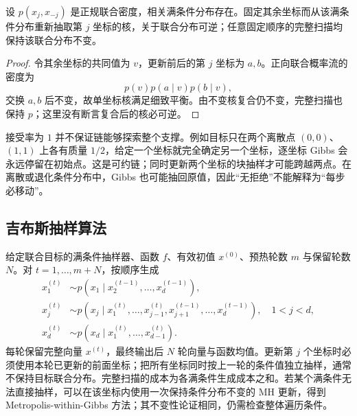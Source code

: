 \begin{proposition}
\label{prop:lh-mcmc-gibbs-invariance}
设 $p(x_j,x_{-j})$ 是正规联合密度，相关满条件分布存在。固定其余坐标而从该满条件分布重新抽取第 $j$ 坐标的核，关于联合分布可逆；任意固定顺序的完整扫描均保持该联合分布不变。
\end{proposition}
\begin{proof}
令其余坐标的共同值为 $v$，更新前后的第 $j$ 坐标为 $a,b$。正向联合概率流的密度为
\[
p(v)p(a\mid v)p(b\mid v),
\]
交换 $a,b$ 后不变，故单坐标核满足细致平衡。由不变核复合仍不变，完整扫描也保持 $p$；这里没有断言复合后的核必可逆。
\end{proof}

接受率为 $1$ 并不保证链能够探索整个支撑。例如目标只在两个离散点 $(0,0)$、$(1,1)$ 上各有质量 $1/2$，给定一个坐标就完全确定另一个坐标，逐坐标 Gibbs 会永远停留在初始点。这是可约链；同时更新两个坐标的块抽样才可能跨越两点。在离散或退化条件分布中，Gibbs 也可能抽回原值，因此“无拒绝”不能解释为“每步必移动”。

\subsection{吉布斯抽样算法}
\label{subsec:lh-mcmc-gibbs-algorithm}

给定联合目标的满条件抽样器、函数 $f$、有效初值 $x^{(0)}$、预热轮数 $m$ 与保留轮数 $N$。对 $t=1,\ldots,m+N$，按顺序生成
\begin{equation}
\begin{aligned}
x_1^{(t)}&\sim p(x_1\mid x_2^{(t-1)},\ldots,x_d^{(t-1)}),\\
x_j^{(t)}&\sim p(x_j\mid x_1^{(t)},\ldots,x_{j-1}^{(t)},
x_{j+1}^{(t-1)},\ldots,x_d^{(t-1)}),\quad 1<j<d,\\
x_d^{(t)}&\sim p(x_d\mid x_1^{(t)},\ldots,x_{d-1}^{(t)}).
\end{aligned}
\label{eq:lh-mcmc-gibbs-sweep}
\end{equation}
每轮保留完整向量 $x^{(t)}$，最终输出后 $N$ 轮向量与函数均值。更新第 $j$ 个坐标时必须使用本轮已更新的前面坐标；把所有坐标同时按上一轮的条件值独立抽样，通常不保持目标联合分布。完整扫描的成本为各满条件生成成本之和。若某个满条件无法直接抽样，可以在该坐标内使用一次保持条件分布不变的 MH 更新，得到 Metropolis-within-Gibbs 方法；其不变性论证相同，仍需检查整体遍历条件。

